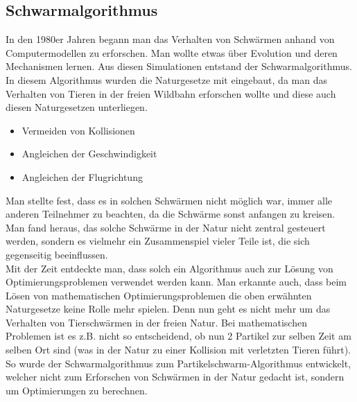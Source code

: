 \subsection{Schwarmalgorithmus}

In den 1980er Jahren begann man das Verhalten von Schwärmen anhand von Computermodellen zu erforschen. Man wollte etwas über Evolution und deren Mechanismen lernen. Aus diesen Simulationen entstand der Schwarmalgorithmus.
In diesem Algorithmus wurden die Naturgesetze mit eingebaut, da man das Verhalten von Tieren in der freien Wildbahn erforschen wollte und diese auch diesen Naturgesetzen unterliegen.

\begin{itemize}
\item Vermeiden von Kollisionen 
\item Angleichen der Geschwindigkeit
\item Angleichen der Flugrichtung
\end{itemize}

Man stellte fest, dass es in solchen Schwärmen nicht möglich war, immer alle anderen Teilnehmer zu beachten, da die Schwärme sonst anfangen zu kreisen. Man fand heraus, das solche Schwärme in der Natur nicht zentral gesteuert werden, sondern es vielmehr ein Zusammenspiel vieler Teile ist, die sich gegenseitig beeinflussen.\\

Mit der Zeit entdeckte man, dass solch ein Algorithmus auch zur Lösung von Optimierungsproblemen verwendet werden kann.
Man erkannte auch, dass beim Lösen von mathematischen Optimierungsproblemen die oben erwähnten Naturgesetze keine Rolle mehr spielen. Denn nun geht es nicht mehr um das Verhalten von Tierschwärmen in der freien Natur. Bei mathematischen Problemen ist es z.B. nicht so entscheidend, ob nun 2 Partikel zur selben Zeit am selben Ort sind (was in der Natur zu einer Kollision mit verletzten Tieren führt). So wurde der Schwarmalgorithmus zum Partikelschwarm-Algorithmus entwickelt, welcher nicht zum Erforschen von Schwärmen in der Natur gedacht ist, sondern um Optimierungen zu berechnen.